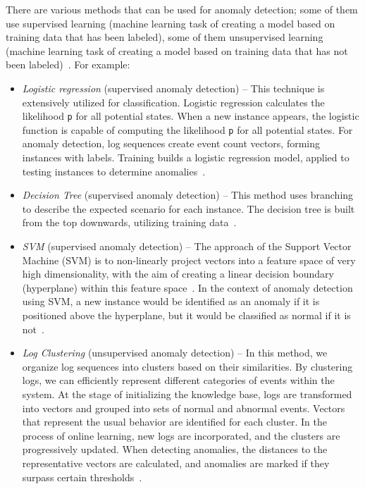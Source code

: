 There are various methods that can be used for anomaly detection; some of them use supervised learning (machine learning task of creating a model based on training data that has been labeled), some of them unsupervised learning (machine learning task of creating a model based on training data that has not been labeled)~\cite{he2016expreport}. For example:
\begin{itemize}
    \item \emph{Logistic regression} (supervised anomaly detection) \--- This technique is extensively utilized for classification. Logistic regression calculates the likelihood \texttt{p} for all potential states. When a new instance appears, the logistic function is capable of computing the likelihood \texttt{p} for all potential states. For anomaly detection, log sequences create event count vectors, forming instances with labels. Training builds a logistic regression model, applied to testing instances to determine anomalies~\cite{he2016expreport}.
    \item \emph{Decision Tree} (supervised anomaly detection) \--- This method uses branching to describe the expected scenario for each instance. The decision tree is built from the top downwards, utilizing training data~\cite{he2016expreport}.
    \item \emph{SVM} (supervised anomaly detection) \--- The approach of the Support Vector Machine (SVM) is to non-linearly project vectors into a feature space of very high dimensionality, with the aim of creating a linear decision boundary (hyperplane) within this feature space~\cite{wang2017research}. In the context of anomaly detection using SVM, a new instance would be identified as an anomaly if it is positioned above the hyperplane, but it would be classified as normal if it is not~\cite{he2016expreport}.
    \item \emph{Log Clustering} (unsupervised anomaly detection) \--- In this method, we organize log sequences into clusters based on their similarities. By clustering logs, we can efficiently represent different categories of events within the system. At the stage of initializing the knowledge base, logs are transformed into vectors and grouped into sets of normal and abnormal events. Vectors that represent the usual behavior are identified for each cluster. In the process of online learning, new logs are incorporated, and the clusters are progressively updated. When detecting anomalies, the distances to the representative vectors are calculated, and anomalies are marked if they surpass certain thresholds~\cite{egersdoerfer2022clusterlog}.

\end{itemize}
